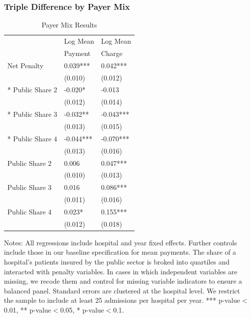 \documentclass[ucs,9pt]{beamer}
\begin{document}
\begin{frame}
\frametitle{Triple Difference by Payer Mix}
\begin{table}[htp]
\centering \normalsize
\caption{Payer Mix Results}
\footnotesize
\begin{tabular}{lll}
\hline	
 		& Log Mean & Log Mean   				 \\
		& Payment & Charge\\
\hline
Net Penalty	&	0.039***	&	0.042***	\\
	&	(0.010)	&	(0.012)	\\
\hspace{0.1in}* Public Share 2 	&	-0.020*	&	-0.013	\\
	&	(0.012)	&	(0.014)	\\
\hspace{0.1in}* Public Share 3	&	-0.032**	&	-0.043***	\\
	&	(0.013)	&	(0.015)	\\
\hspace{0.1in}* Public Share 4	&	-0.044***	&	-0.070***	\\
	&	(0.013)	&	(0.016)	\\
Public Share 2		&	0.006	&	0.047***	\\
	&	(0.010)	&	(0.013)	\\
Public Share 3		&	0.016	&	0.086***	\\
	&	(0.011)	&	(0.016)	\\
Public Share 4		&	0.023*	&	0.155***	\\
	&	(0.012)	&	(0.018)	\\
\hline
\end{tabular}
\end{table}
\tiny Notes: All regressions include hospital and year fixed effects.  Further controls include those in our baseline specification for mean payments.  The share of a hospital's patients insured by the public sector is broked into quartiles and interacted with penalty variables.  In cases in which independent variables are missing, we recode them and control for missing variable indicators to ensure a balanced panel.  Standard errors are clustered at the hospital level.  We restrict the sample to include at least 25 admissions per hospital per year.  *** p-value$<$0.01, ** p-value$<$0.05, * p-value$<$0.1.
\end{frame}
\end{document}
